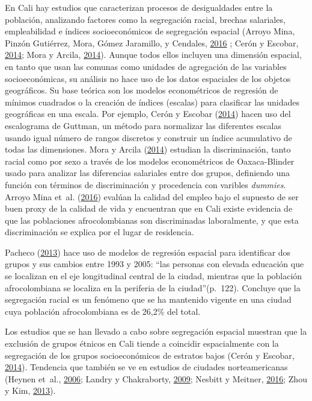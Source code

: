\documentclass[12pt,a4paper,oneside, openany]{book}
\theoremstyle{definition}
\theoremstyle{definition}
\theoremstyle{definition}
\theoremstyle{remark}
\begin{document}
En Cali hay estudios que caracterizan procesos de desigualdades entre la
población, analizando factores como la segregación racial, brechas
salariales, empleabilidad e índices socioeconómicos de segregación
espacial (Arroyo Mina, Pinzón Gutiérrez, Mora, Gómez Jaramillo, y
Cendales, \protect\hyperlink{ref-arroyo_mina_afrocolombianos_2016}{2016}
; Cerón y Escobar, \protect\hyperlink{ref-ceron_indice_2014}{2014}; Mora
y Arcila, \protect\hyperlink{ref-mora_brechas_2014}{2014}). Aunque todos
ellos incluyen una dimensión espacial, en tanto que usan las comunas
como unidades de agregación de las variables socioeconómicas, su
análisis no hace uso de los datos espaciales de los objetos geográficos.
Su base teórica son los modelos econométricos de regresión de mínimos
cuadrados o la creación de índices (escalas) para clasificar las
unidades geográficas en una escala. Por ejemplo, Cerón y Escobar
(\protect\hyperlink{ref-ceron_indice_2014}{2014}) hacen uso del
escalograma de Guttman, un método para normalizar las diferentes escalas
usando igual número de rangos discretos y construir un índice
acumulativo de todas las dimensiones. Mora y Arcila
(\protect\hyperlink{ref-mora_brechas_2014}{2014}) estudian la
discriminación, tanto racial como por sexo a través de los modelos
econométricos de Oaxaca-Blinder usado para analizar las diferencias
salariales entre dos grupos, definiendo una función con términos de
discriminación y procedencia con varibles \emph{dummies}. Arroyo Mina
et~al. (\protect\hyperlink{ref-arroyo_mina_afrocolombianos_2016}{2016})
evalúan la calidad del empleo bajo el supuesto de ser buen proxy de la
calidad de vida y encuentran que en Cali existe evidencia de que las
poblaciones afrocolombianas son discriminadas laboralmente, y que esta
discriminación se explica por el lugar de residencia.

Pacheco (\protect\hyperlink{ref-PACHECO2013121}{2013}) hace uso de
modelos de regresión espacial para identificar dos grupos y sus cambios
entre 1993 y 2005: ``las personas con elevada educación que se localizan
en el eje longitudinal central de la ciudad, mientras que la población
afrocolombiana se localiza en la periferia de la ciudad''(p.~122).
Concluye que la segregación racial es un fenómeno que se ha mantenido
vigente en una ciudad cuya población afrocolombiana es de 26,2\% del
total.

Los estudios que se han llevado a cabo sobre segregación espacial
muestran que la exclusión de grupos étnicos en Cali tiende a coincidir
espacialmente con la segregación de los grupos socioeconómicos de
estratos bajos (Cerón y Escobar,
\protect\hyperlink{ref-ceron_indice_2014}{2014}). Tendencia que también
se ve en estudios de ciudades norteamericanas (Heynen et~al.,
\protect\hyperlink{ref-heynen_political_2006}{2006}; Landry y
Chakraborty, \protect\hyperlink{ref-landry_street_2009}{2009}; Nesbitt y
Meitner, \protect\hyperlink{ref-nesbitt_exploring_2016}{2016}; Zhou y
Kim, \protect\hyperlink{ref-zhou_social_2013}{2013}).
\end{document}
